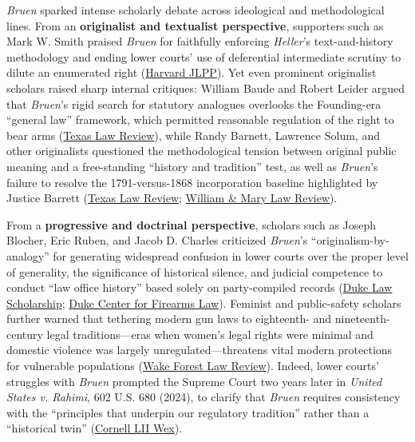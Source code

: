 \documentclass[12pt]{article}
\begin{document}
\textit{Bruen} sparked intense scholarly debate across ideological and methodological lines. From an \textbf{originalist and textualist perspective}, supporters such as Mark W. Smith praised \textit{Bruen} for faithfully enforcing \textit{Heller}'s text-and-history methodology and ending lower courts' use of deferential intermediate scrutiny to dilute an enumerated right (\href{https://journals.law.harvard.edu/jlpp/much-ado-about-nothing-rahimi-reinforces-bruen-and-heller-mark-w-smith/}{Harvard JLPP}). Yet even prominent originalist scholars raised sharp internal critiques: William Baude and Robert Leider argued that \textit{Bruen}'s rigid search for statutory analogues overlooks the Founding-era ``general law'' framework, which permitted reasonable regulation of the right to bear arms (\href{https://texaslawreview.org/applying-history-as-law-the-role-of-historical-facts-in-implementing-constitutional-doctrine/}{Texas Law Review}), while Randy Barnett, Lawrence Solum, and other originalists questioned the methodological tension between original public meaning and a free-standing ``history and tradition'' test, as well as \textit{Bruen}'s failure to resolve the 1791-versus-1868 incorporation baseline highlighted by Justice Barrett (\href{https://texaslawreview.org/applying-history-as-law-the-role-of-historical-facts-in-implementing-constitutional-doctrine/}{Texas Law Review}; \href{https://scholarship.law.wm.edu/cgi/viewcontent.cgi?article=4000&context=wmlr}{William \& Mary Law Review}).

From a \textbf{progressive and doctrinal perspective}, scholars such as Joseph Blocher, Eric Ruben, and Jacob D. Charles criticized \textit{Bruen}'s ``originalism-by-analogy'' for generating widespread confusion in lower courts over the proper level of generality, the significance of historical silence, and judicial competence to conduct ``law office history'' based solely on party-compiled records (\href{https://scholarship.law.duke.edu/cgi/viewcontent.cgi?article=6973&context=faculty_scholarship}{Duke Law Scholarship}; \href{https://firearmslaw.duke.edu/wp-content/uploads/2023/06/Bruen-and-the-Silent-Past-3.20.2023-Version.pdf}{Duke Center for Firearms Law}). Feminist and public-safety scholars further warned that tethering modern gun laws to eighteenth- and nineteenth-century legal traditions---eras when women's legal rights were minimal and domestic violence was largely unregulated---threatens vital modern protections for vulnerable populations (\href{https://www.wakeforestlawreview.com/wp-content/uploads/2024/06/59-Wake-Forest-L.-Rev.-131.pdf}{Wake Forest Law Review}). Indeed, lower courts' struggles with \textit{Bruen} prompted the Supreme Court two years later in \textit{United States v. Rahimi}, 602 U.S. 680 (2024), to clarify that \textit{Bruen} requires consistency with the ``principles that underpin our regulatory tradition'' rather than a ``historical twin'' (\href{https://www.law.cornell.edu/wex/second_amendment}{Cornell LII Wex}).
\end{document}
